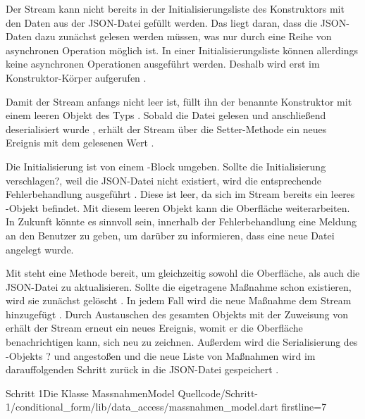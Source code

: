 Der Stream kann nicht bereits in der Initialisierungsliste des Konstruktors mit den Daten aus der JSON-Datei gefüllt werden.
Das liegt daran, dass die JSON-Daten dazu zunächst gelesen werden müssen, was nur durch eine Reihe von asynchronen Operation möglich ist.
In einer Initialisierungsliste können allerdings keine asynchronen Operationen ausgeführt werden.
Deshalb wird  erst im Konstruktor-Körper aufgerufen .

Damit der Stream anfangs nicht leer ist, füllt ihn der benannte Konstruktor  mit einem leeren Objekt des Typs  .
Sobald die Datei gelesen  und anschließend deserialisiert wurde , erhält der Stream über die Setter-Methode  ein neues Ereignis mit dem gelesenen Wert .

Die Initialisierung ist von einem -Block umgeben.
Sollte die Initialisierung verschlagen?, weil die JSON-Datei nicht existiert, wird die entsprechende Fehlerbehandlung ausgeführt .
Diese ist leer, da sich im Stream bereits ein leeres -Objekt  befindet.
Mit diesem leeren Objekt kann die Oberfläche weiterarbeiten.
In Zukunft könnte es sinnvoll sein, innerhalb der Fehlerbehandlung eine Meldung an den Benutzer zu geben, um darüber zu informieren, dass eine neue Datei angelegt wurde.

Mit   steht eine Methode bereit, um gleichzeitig  sowohl die Oberfläche,  als auch die JSON-Datei zu aktualisieren.
Sollte die eigetragene Maßnahme schon existieren, wird sie zunächst gelöscht .
In jedem Fall wird die neue Maßnahme dem Stream hinzugefügt .
Durch Austauschen des gesamten Objekts mit der Zuweisung von   erhält der Stream erneut ein neues Ereignis, womit er die Oberfläche benachrichtigen kann, sich neu zu zeichnen. Außerdem wird die Serialisierung des -Objekts ? und angestoßen  und die neue Liste von Maßnahmen wird im darauffolgenden Schritt zurück in die JSON-Datei gespeichert .

\begin{alexlisting}{Schritt 1}{Die Klasse MassnahmenModel}
  {Quellcode/Schritt-1/conditional_form/lib/data_access/massnahmen_model.dart}
  {firstline=7}
  \label{lst:Schritt1KlasseMassnahmenModel}
\end{alexlisting}

\clearpage

